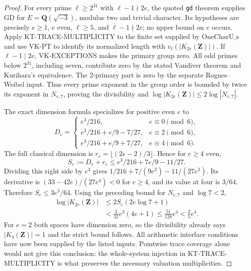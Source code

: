 \begin{proof}
For every prime $\ell\geq2^{31}$ with $\ell-1\nmid2e$,
the quoted \texttt{gd} theorem supplies $\mathrm{GD}$ for
$E=\mathbf Q(\sqrt{-3})$, modulus two and trivial character.
Its hypotheses are precisely $e\geq1$, $e$ even,
$\ell\geq5$, and $\ell-1\nmid2e$; no upper bound on $e$
occurs. Apply
KT-TRACE-MULTIPLICITY to the finite set supplied by
$\mathrm{OneCharU\_s}$ and use VK-PT to identify its normalized
length with $v_\ell(|K_{2e}(\mathbf Z)|)$.
If $\ell-1\mid2e$, VK-EXCEPTIONS makes the primary group zero.
All odd primes below $2^{31}$, including seven, contribute zero
by the stated Vandiver theorem and Kurihara's equivalence.
The $2$-primary part is zero by the separate Rognes--Weibel input.
Thus every prime exponent in the group order is bounded by twice
its exponent in $N_{e,7}$, proving the divisibility and
$\log|K_{2e}(\mathbf Z)|\leq2\log|N_{e,7}|$.

The exact dimension formula specializes for positive even $e$ to
\[
D_e=\begin{cases}
e^3/216,&e\equiv0\pmod6,\\
e^3/216+e/9-7/27,&e\equiv2\pmod6,\\
e^3/216+e/9+7/27,&e\equiv4\pmod6.
\end{cases}
\]
The full classical dimension is
$r_e=\lfloor(2e-2)/3\rfloor$.
Hence for $e\geq4$ even,
\[
 S_e:=D_e+r_e\leq e^3/216+7e/9-11/27.
\]
Dividing this right side by $e^3$ gives
$1/216+7/(9e^2)-11/(27e^3)$.
Its derivative is $(33-42e)/(27e^4)<0$ for $e\geq4$,
and its value at four is $3/64$. Therefore $S_e\leq3e^3/64$.
Using the preceding bound for $N_{e,7}$ and $\log7<2$,
\begin{align*}
 \log|K_{2e}(\mathbf Z)|
 &\leq 2S_e(2e\log7+1)\\
 &<\frac3{32}e^3(4e+1)
 \leq\frac{51}{128}e^4<\frac25e^4.
\end{align*}
For $e=2$ both spaces have dimension zero, so the divisibility
already says $|K_4(\mathbf Z)|=1$ and the strict bound follows.
All arithmetic interface conditions have now been supplied by
the listed inputs. Pointwise trace coverage alone would not
give this conclusion: the whole-system injection in
KT-TRACE-MULTIPLICITY is what preserves the necessary
valuation multiplicities.
\end{proof}
